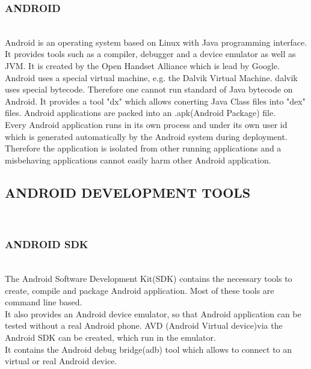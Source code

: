 \documentclass[12pt,a4paper]{article}
\begin{document}
\newpage
\subsubsection{ANDROID}
\\
\hspace{0.7 cm} Android is an operating system based on Linux with Java programming interface. It provides tools such as a compiler, debugger and a device emulator as well as JVM. It is created by the Open Handset Alliance which is lead by Google.
\\
\hspace{0.7 cm} Android uses a special virtual machine, e.g. the Dalvik Virtual Machine. dalvik uses special bytecode. Therefore one cannot run standard of Java bytecode on Android. It provides a tool "dx" which allows conerting Java Class files into "dex" files. Android applications are packed into an .apk(Android Package) file.
\\
\hspace{0.7 cm} Every Android application runs in its own process and under its own user id which is generated automatically by the Android system during deployment. Therefore the application is isolated from other running applications and a misbehaving applications cannot easily harm other Android application.
\\

\subsection{ANDROID DEVELOPMENT TOOLS}
\\
\subsubsection{ANDROID SDK}
\\
\hspace{0.7 cm} The Android Software Development Kit(SDK) contains the necessary tools to create, compile and package Android application. Most of these tools are command line based.
\\
\hspace{0.7 cm} It also provides an Android device emulator, so that Android application can be tested without a real Android phone. AVD (Android Virtual device)via the Android SDK can be created, which run in the emulator.
\\
\hspace{0.7 cm} It contains the Android debug bridge(adb) tool which allows to connect to an virtual or real Android device.
\\
\end{document}
